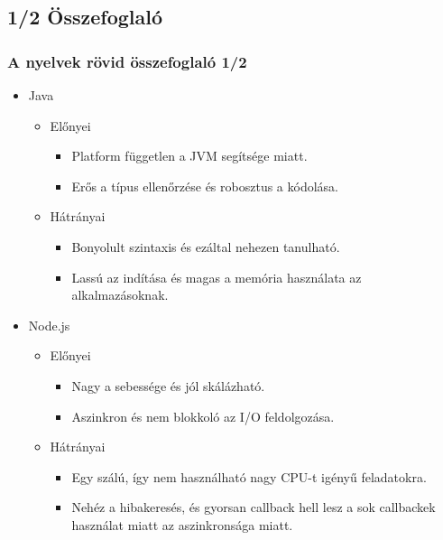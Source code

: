 \documentclass[10pt]{beamer}
\begin{document}
	\subsection{1/2 Összefoglaló}
	\begin{frame}
		\frametitle{A nyelvek rövid összefoglaló 1/2}

		\begin{itemize}
			\item Java
				\begin{itemize}
					\item Előnyei
						\begin{itemize}
							\item Platform független a JVM segítsége miatt.

							\item Erős a típus ellenőrzése és robosztus a kódolása.
						\end{itemize}

					\item Hátrányai
						\begin{itemize}
							\item Bonyolult szintaxis és ezáltal nehezen tanulható.

							\item Lassú az indítása és magas a memória használata az alkalmazásoknak.
						\end{itemize}
				\end{itemize}

			\item Node.js
				\begin{itemize}
					\item Előnyei
						\begin{itemize}
							\item Nagy a sebessége és jól skálázható.

							\item Aszinkron és nem blokkoló az I/O feldolgozása.
						\end{itemize}

					\item Hátrányai
						\begin{itemize}
							\item Egy szálú, így nem használható nagy CPU-t igényű feladatokra.

							\item Nehéz a hibakeresés, és gyorsan callback hell lesz a sok
								callbackek használat miatt az aszinkronsága miatt.
						\end{itemize}
				\end{itemize}
		\end{itemize}
	\end{frame}
	\transdissolve
\end{document}
